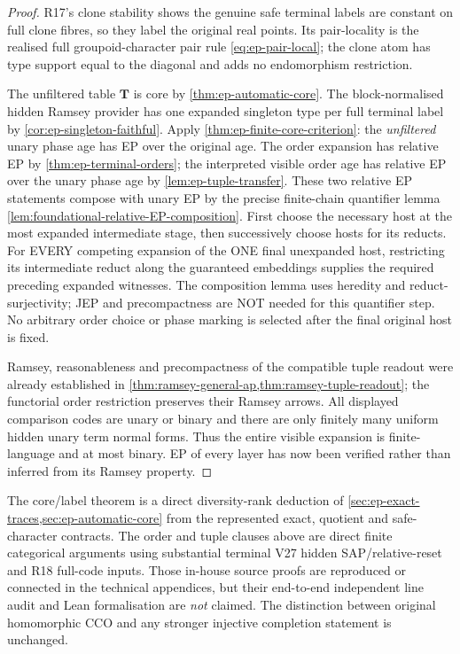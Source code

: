 \begin{proof}
R17's clone stability shows the
genuine safe terminal labels are
constant on full clone fibres,
so they label the original real
points. Its pair-locality is the
realised full groupoid-character
pair rule \eqref{eq:ep-pair-local};
the clone atom has type support
equal to the diagonal and adds
no endomorphism restriction.

The unfiltered table \(\mathbf T\)
is core by \cref{thm:ep-automatic-core}.
The block-normalised hidden Ramsey
provider has one expanded singleton
type per full terminal label by
\cref{cor:ep-singleton-faithful}.
Apply \cref{thm:ep-finite-core-criterion}:
the \emph{unfiltered} unary phase age
has EP over the original age.
The order expansion has relative EP by
\cref{thm:ep-terminal-orders};
the interpreted visible order age
has relative EP over the unary phase
age by \cref{lem:ep-tuple-transfer}.
These two relative EP statements
compose with unary EP by the
precise finite-chain quantifier lemma
\cref{lem:foundational-relative-EP-composition}.
First choose the necessary host at the
most expanded intermediate stage, then
successively choose hosts for its reducts.
For EVERY competing expansion of the
ONE final unexpanded host, restricting
its intermediate reduct along the
guaranteed embeddings supplies the
required preceding expanded witnesses.
The composition lemma uses heredity
and reduct-surjectivity; JEP and
precompactness are NOT needed for
this quantifier step. No arbitrary
order choice or phase marking is
selected after the final original
host is fixed.

Ramsey, reasonableness and
precompactness of the compatible
tuple readout were already
established in
\cref{thm:ramsey-general-ap,thm:ramsey-tuple-readout}; the
functorial order restriction
preserves their Ramsey arrows.
All displayed comparison codes
are unary or binary and there are
only finitely many uniform hidden
unary term normal forms.
Thus the entire visible expansion
is finite-language and at most
binary. EP of every layer has
now been verified rather than
inferred from its Ramsey property.
\end{proof}

\begin{remark}
\label{rem:ep-final-audit}
The core/label theorem is a direct
diversity-rank deduction of
\cref{sec:ep-exact-traces,sec:ep-automatic-core}
from the represented exact, quotient
and safe-character contracts.
The order and tuple clauses above
are direct finite categorical
arguments using substantial
terminal V27 hidden SAP/relative-reset
and R18 full-code inputs.
Those in-house source proofs are
reproduced or connected in the
technical appendices, but their
end-to-end independent line audit
and Lean formalisation are
\emph{not} claimed. The distinction
between original homomorphic CCO
and any stronger injective completion
statement is unchanged.
\end{remark}
